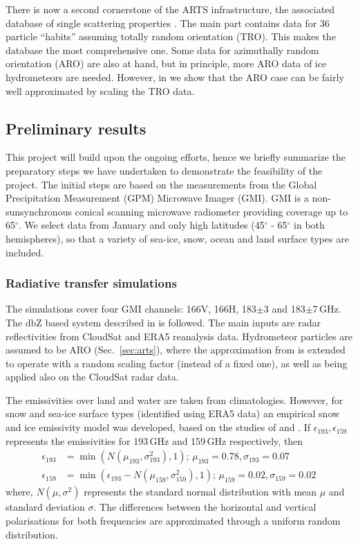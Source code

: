 \documentclass[12pt,oneside,a4paper]{article}
\begin{document}
There is now a second cornerstone of the ARTS infrastructure, the associated
database of single scattering properties \citep{eriksson:agene:18}. The main
part contains data for 36 particle ``habits'' assuming totally random
orientation (TRO). This makes the database the most comprehensive one. Some
data for azimuthally random orientation (ARO) are also at hand, but in 
principle, more ARO data of ice hydrometeors are needed. However, in \citet{barlakas:intro:21} we show that the ARO case can be fairly well approximated by scaling the TRO data.

\subsection{Preliminary results}
%
This project will build upon the ongoing efforts, hence we briefly summarize
the preparatory steps we have undertaken to demonstrate the feasibility of the
project. The initial steps are based on the measurements from the Global
Precipitation Measurement (GPM) Microwave Imager (GMI). GMI is a
non-sunsynchronous conical scanning microwave radiometer providing coverage
up to 65$^{\circ}$. We select data from January and only high latitudes
(45$^{\circ}$ - 65$^{\circ}$ in both hemispheres), so that a variety of
sea-ice, snow, ocean and land surface types are included.

\subsubsection{Radiative transfer simulations}
%
\label{sec:radiative_transfer}
The simulations cover four GMI channels: 166V, 166H, 183$\pm$3
and 183$\pm$7\,GHz. The dbZ based
system described in \citet{ekelund:using:20} is followed. The
main inputs are radar reflectivities from CloudSat and ERA5 reanalysis data.
Hydrometeor particles are assumed to be ARO (Sec.~\ref{sec:arts}), where the
approximation from \citet{barlakas:intro:21} is extended to operate with 
a random scaling factor (instead of a fixed one), as well as being applied also
on the CloudSat radar data.

The emissivities over land and water are taken from climatologies. However, for
snow and sea-ice surface types (identified using ERA5 data) an empirical snow
and ice emissivity model was developed, based on the studies of
\citet{harlow:2009:milli} and \citet{hewison:2002:airbo}. If
$\epsilon_{193}, \epsilon_{159}$ represents the emissivities for 193\,GHz and
159\,GHz respectively, then
\begin{align}
\epsilon_{193}& = \min({N(\mu_{193}, \sigma_{193}^{2}), 1});\, \mu_{193} = 0.78, \sigma_{193} = 0.07 \label{eq:1}\\
\epsilon_{159}& = \min(\epsilon_{193} - N(\mu_{159}, \sigma_{159}^{2}), 1) ;\,  \mu_{159} = 0.02, \sigma_{159} = 0.02\,\label{eq:2}
\end{align}
where, $N(\mu, \sigma^{2})$ represents the standard normal distribution with
mean $\mu$ and standard deviation $\sigma$. The differences between the
horizontal and vertical polarisations for both frequencies are 
approximated through a uniform random distribution.
\end{document}
